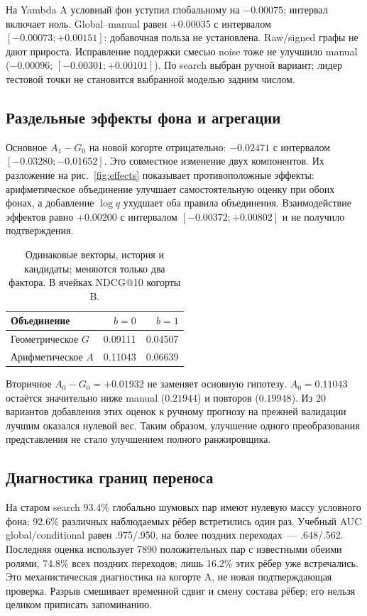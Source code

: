 \documentclass[10pt,a4paper,twocolumn]{article}
\newcommand{\ConditionalDelta}{-0.00075}
\newcommand{\MixtureDelta}{-0.00096}
\newcommand{\MixtureLow}{-0.00301}
\newcommand{\MixtureHigh}{+0.00101}
\newcommand{\PrimaryDelta}{-0.02471}
\newcommand{\PrimaryLow}{-0.03280}
\newcommand{\PrimaryHigh}{-0.01652}
\newcommand{\ArithmeticDelta}{+0.01932}
\newcommand{\AzeroShort}{0.11043}
\newcommand{\ManualNewShort}{0.21944}
\newcommand{\RepeatNewShort}{0.19948}
\begin{document}
На Yambda A условный фон уступил глобальному на $\ConditionalDelta$;
интервал включает ноль. Global--manual равен +0.00035
с интервалом $[-0.00073;+0.00151]$: добавочная польза не установлена.
Raw/signed графы не дают прироста. Исправление поддержки смесью noise
тоже не улучшило manual ($\MixtureDelta$;
$[\MixtureLow;\allowbreak\MixtureHigh]$).
По search выбран ручной вариант; лидер тестовой точки не становится
выбранной моделью задним числом.

\subsection{Раздельные эффекты фона и агрегации}
Основное $A_1-G_0$ на новой когорте отрицательно:
$\PrimaryDelta$ с интервалом $[\PrimaryLow;\allowbreak\PrimaryHigh]$.
Это совместное изменение двух компонентов. Их разложение
на рис.~\ref{fig:effects} показывает противоположные эффекты:
арифметическое объединение улучшает самостоятельную оценку при обоих фонах,
а добавление $\log q$ ухудшает оба правила объединения.
Взаимодействие эффектов равно +0.00200
с интервалом $[-0.00372;+0.00802]$ и не получило подтверждения.

\begin{table}[t]
\centering\small
\caption{Одинаковые векторы, история и кандидаты; меняются только
два фактора. В ячейках NDCG@10 когорты B.}
\label{tab:factorial}
\begin{tabular}{@{}lrr@{}}\toprule
Объединение & $b=0$ & $b=1$\\\midrule
Геометрическое $G$ & 0.09111 & 0.04507 \\
Арифметическое $A$ & 0.11043 & 0.06639 \\
\bottomrule\end{tabular}
\end{table}

Вторичное $A_0-G_0=\ArithmeticDelta$ не заменяет основную гипотезу.
$A_0=\AzeroShort$ остаётся значительно ниже manual
($\ManualNewShort$) и повторов ($\RepeatNewShort$).
Из 20 вариантов добавления этих оценок к ручному прогнозу на прежней валидации
лучшим оказался нулевой вес. Таким образом, улучшение одного
преобразования представления не стало улучшением полного ранжировщика.



\subsection{Диагностика границ переноса}
На старом search 93.4\% глобально шумовых пар имеют нулевую массу
условного фона; 92.6\% различных наблюдаемых рёбер встретились один раз.
Учебный AUC global/conditional равен .975/.950,
на более поздних переходах~--- .648/.562.
Последняя оценка использует 7890 положительных пар с известными обеими
ролями, 74.8\% всех поздних переходов; лишь 16.2\% этих рёбер уже встречались.
Это механистическая диагностика на когорте A, не новая подтверждающая проверка.
Разрыв смешивает временной сдвиг и смену состава рёбер;
его нельзя целиком приписать запоминанию.
\end{document}
